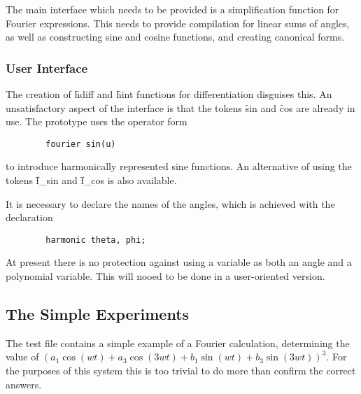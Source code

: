 The main interface which needs to be provided is a simplification
function for Fourier expressions.  This needs to provide compilation
for linear sums of angles, as well as constructing sine and cosine
functions, and creating canonical forms.

\subsubsection{User Interface}

The creation of \f{hdiff} and \f{hint} functions for
differentiation disguises this.  An unsatisfactory aspect of the
interface is that the tokens \f{sin} and \f{cos} are already in
use.  The prototype uses the operator form
\begin{verbatim}
        fourier sin(u)
\end{verbatim}
to introduce harmonically represented sine functions.  An alternative of
using the tokens \f{f\_sin} and \f{f\_cos} is also available.

It is necessary to declare the names of the angles, which is achieved
with the declaration
\begin{verbatim}
        harmonic theta, phi;
\end{verbatim}

At present there is no protection against using a variable as both an
angle and a polynomial variable.  This will nooed to be done in a
user-oriented version.

\subsection{The Simple Experiments}

The \REDUCE test file contains a simple example of a Fourier
calculation, determining the value of $(a_1 \cos({wt}) + a_3
\cos(3{wt}) + b_1 \sin({wt}) + b_3 \sin(3{wt}))^3$.  For the purposes
of this system this is too trivial to do more than confirm the correct
answers.

